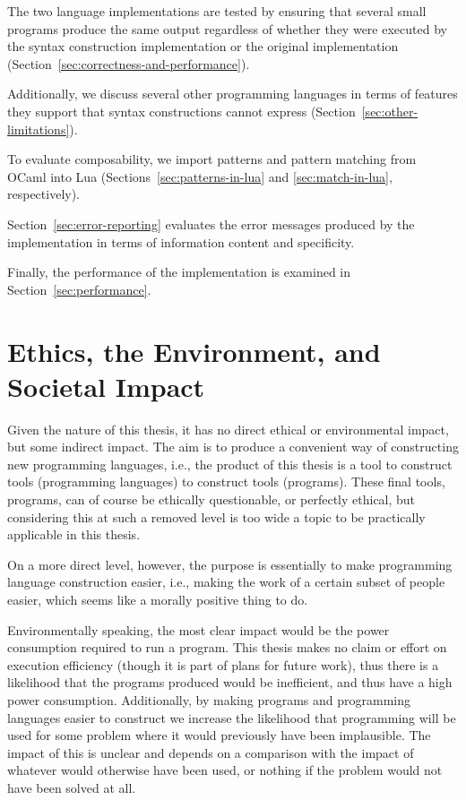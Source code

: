 \documentclass{kththesis}
\begin{document}
The two language implementations are tested by ensuring that several small programs produce the same output regardless of whether they were executed by the syntax construction implementation or the original implementation (Section~\ref{sec:correctness-and-performance}).

Additionally, we discuss several other programming languages in terms of features they support that syntax constructions cannot express (Section~\ref{sec:other-limitations}).

To evaluate composability, we import patterns and pattern matching from OCaml into Lua (Sections~\ref{sec:patterns-in-lua} and \ref{sec:match-in-lua}, respectively).

Section~\ref{sec:error-reporting} evaluates the error messages produced by the implementation in terms of information content and specificity.

Finally, the performance of the implementation is examined in Section~\ref{sec:performance}.

\section{Ethics, the Environment, and Societal Impact}

Given the nature of this thesis, it has no direct ethical or environmental impact, but some indirect impact. The aim is to produce a convenient way of constructing new programming languages, i.e., the product of this thesis is a tool to construct tools (programming languages) to construct tools (programs). These final tools, programs, can of course be ethically questionable, or perfectly ethical, but considering this at such a removed level is too wide a topic to be practically applicable in this thesis.

On a more direct level, however, the purpose is essentially to make programming language construction easier, i.e., making the work of a certain subset of people easier, which seems like a morally positive thing to do.

Environmentally speaking, the most clear impact would be the power consumption required to run a program. This thesis makes no claim or effort on execution efficiency (though it is part of plans for future work), thus there is a likelihood that the programs produced would be inefficient, and thus have a high power consumption. Additionally, by making programs and programming languages easier to construct we increase the likelihood that programming will be used for some problem where it would previously have been implausible. The impact of this is unclear and depends on a comparison with the impact of whatever would otherwise have been used, or nothing if the problem would not have been solved at all.
\end{document}
